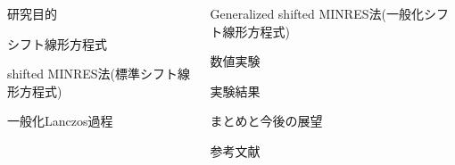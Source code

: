 \documentclass[final, dvipdfmx]{beamer}
\begin{document}
\begin{frame}[t]{}
	
	\vspace{-\baselineskip}
	\begin{columns}[T]
	\begin{column}{.49\linewidth}
		\begin{block}{研究目的}
			\vspace{0.2\baselineskip}
			
		\end{block}
		\begin{block}{シフト線形方程式}
			\vspace{0.2\baselineskip}
			
		\end{block}
		\begin{block}{shifted MINRES法{\normalsize (標準シフト線形方程式)}}
			\vspace{0.2\baselineskip}
			
		\end{block}
		\begin{block}{一般化Lanczos過程}
			\vspace{0.3\baselineskip}
			
		\end{block}
	\end{column}
	\hspace{0.0\columnwidth}
	\begin{column}{.49\linewidth}
		\begin{block}{Generalized shifted MINRES法{\normalsize (一般化シフト線形方程式)}}
			\vspace{0.2\baselineskip}
			\vspace{2pt} %
			
		\end{block}
		\begin{block}{数値実験}
			\vspace{0.2\baselineskip}
			\vspace{2pt} %
			
		\end{block}
		\begin{block}{実験結果}
			\vspace{0.3\baselineskip}
			\vspace{2pt} %
			
		\end{block}
		\begin{block}{まとめと今後の展望}
			\vspace{0.2\baselineskip}
			\vspace{2pt} %
			
		\end{block}
		\begin{block}{参考文献}
			\vspace{2pt} %
			
		\end{block}
	\end{column}
	\end{columns}
	\vspace{0.4\baselineskip}
\end{frame}
\end{document}
